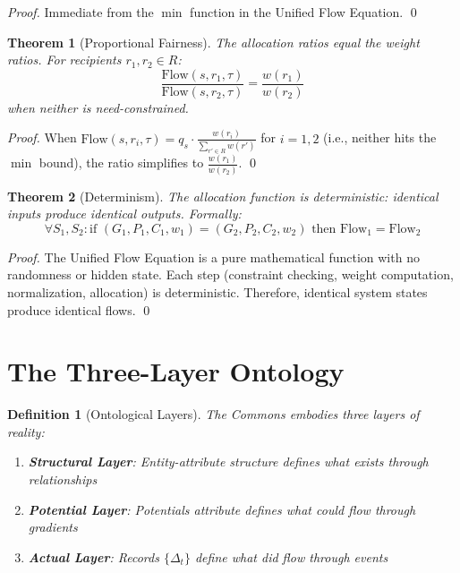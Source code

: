 \documentclass[11pt]{article}
\newtheorem{definition}{Definition}
\newtheorem{theorem}{Theorem}
\begin{document}
\begin{proof}
Immediate from the $\min$ function in the Unified Flow Equation. \qed
\end{proof}

\begin{theorem}[Proportional Fairness]
The allocation ratios equal the weight ratios. For recipients $r_1, r_2 \in R$:
\[
\frac{\text{Flow}(s, r_1, \tau)}{\text{Flow}(s, r_2, \tau)} = \frac{w(r_1)}{w(r_2)}
\]
when neither is need-constrained.
\end{theorem}

\begin{proof}
When $\text{Flow}(s, r_i, \tau) = q_s \cdot \frac{w(r_i)}{\sum_{r' \in R} w(r')}$ for $i = 1, 2$ (i.e., neither hits the $\min$ bound), the ratio simplifies to $\frac{w(r_1)}{w(r_2)}$. \qed
\end{proof}

\begin{theorem}[Determinism]
The allocation function is deterministic: identical inputs produce identical outputs. Formally:
\[
\forall S_1, S_2: \text{if } (G_1, P_1, C_1, w_1) = (G_2, P_2, C_2, w_2) \text{ then } \text{Flow}_1 = \text{Flow}_2
\]
\end{theorem}

\begin{proof}
The Unified Flow Equation is a pure mathematical function with no randomness or hidden state. Each step (constraint checking, weight computation, normalization, allocation) is deterministic. Therefore, identical system states produce identical flows. \qed
\end{proof}

\section{The Three-Layer Ontology}

\begin{definition}[Ontological Layers]
The Commons embodies three layers of reality:
\begin{enumerate}
\item \textbf{Structural Layer}: Entity-attribute structure defines what exists through relationships
\item \textbf{Potential Layer}: Potentials attribute defines what \emph{could} flow through gradients
\item \textbf{Actual Layer}: Records $\{\Delta_t\}$ define what \emph{did} flow through events
\end{enumerate}
\end{definition}
\end{document}
